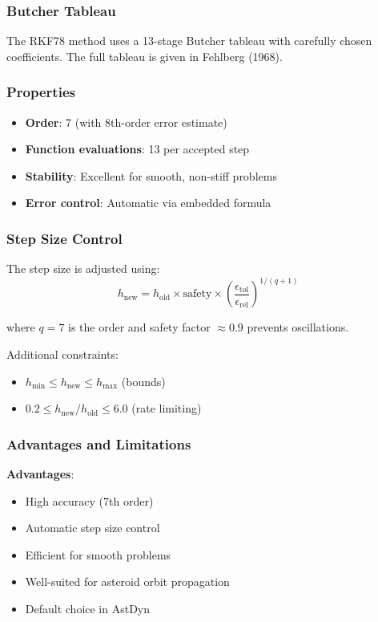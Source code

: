 \subsubsection{Butcher Tableau}

The RKF78 method uses a 13-stage Butcher tableau with carefully chosen coefficients. The full tableau is given in Fehlberg (1968).

\subsubsection{Properties}

\begin{itemize}
    \item \textbf{Order}: 7 (with 8th-order error estimate)
    \item \textbf{Function evaluations}: 13 per accepted step
    \item \textbf{Stability}: Excellent for smooth, non-stiff problems
    \item \textbf{Error control}: Automatic via embedded formula
\end{itemize}

\subsubsection{Step Size Control}

The step size is adjusted using:
\begin{equation}
    h_{\text{new}} = h_{\text{old}} \times \text{safety} \times \left(\frac{\epsilon_{\text{tol}}}{\epsilon_{\text{rel}}}\right)^{1/(q+1)}
\end{equation}

where $q = 7$ is the order and safety factor $\approx 0.9$ prevents oscillations.

Additional constraints:
\begin{itemize}
    \item $h_{\text{min}} \leq h_{\text{new}} \leq h_{\text{max}}$ (bounds)
    \item $0.2 \leq h_{\text{new}}/h_{\text{old}} \leq 6.0$ (rate limiting)
\end{itemize}

\subsubsection{Advantages and Limitations}

\textbf{Advantages}:
\begin{itemize}
    \item High accuracy (7th order)
    \item Automatic step size control
    \item Efficient for smooth problems
    \item Well-suited for asteroid orbit propagation
    \item Default choice in AstDyn
\end{itemize}

